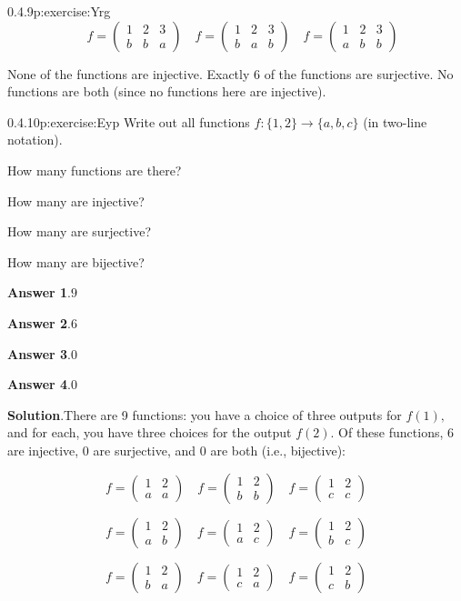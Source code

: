 \documentclass[twoside,11pt,]{book}
\newcommand{\blocktitlefont}{\relax}
\numberwithin{equation}{chapter}
\newcommand{\twoline}[2]{\begin{pmatrix}#1 \\ #2 \end{pmatrix}}
\newcommand{\amp}{&}
\begin{document}
\begin{divisionsolution}{0.4.9}{}{p:exercise:Yrg}
%
\begin{equation*}
\quad f = \begin{pmatrix} 1 \amp 2 \amp 3 \\ b \amp b \amp a \end{pmatrix} \quad f = \begin{pmatrix} 1 \amp 2 \amp 3 \\ b \amp a\amp b \end{pmatrix} \quad f = \begin{pmatrix} 1 \amp 2 \amp 3 \\ a \amp b \amp b \end{pmatrix}
\end{equation*}
%
\par
None of the functions are injective. Exactly 6 of the functions are surjective. No functions are both (since no functions here are injective).%
\end{divisionsolution}%
\begin{divisionsolution}{0.4.10}{}{p:exercise:Eyp}%
Write out all functions \(f: \{1,2\} \to \{a,b,c\}\) (in two-line notation).%
\par
How many functions are there?%
\par
How many are injective?%
\par
How many are surjective?%
\par
How many are bijective?%
\par\smallskip%
\noindent\textbf{\blocktitlefont Answer 1}.\quad{}\(9\)%
\par\smallskip%
\noindent\textbf{\blocktitlefont Answer 2}.\quad{}\(6\)%
\par\smallskip%
\noindent\textbf{\blocktitlefont Answer 3}.\quad{}\(0\)%
\par\smallskip%
\noindent\textbf{\blocktitlefont Answer 4}.\quad{}\(0\)%
\par\smallskip%
\noindent\textbf{\blocktitlefont Solution}.\quad{}There are 9 functions: you have a choice of three outputs for \(f(1)\text{,}\) and for each, you have three choices for the output \(f(2)\text{.}\) Of these functions, 6 are injective, 0 are surjective, and 0 are both (i.e., bijective):%
\par
%
\begin{equation*}
f = \twoline{1 \amp 2}{a\amp a} \quad f = \twoline{1 \amp 2}{b \amp b} \quad f = \twoline{1 \amp 2}{c \amp c}
\end{equation*}
%
\par
%
\begin{equation*}
f = \twoline{1 \amp 2}{a\amp b} \quad f = \twoline{1 \amp 2}{a \amp c} \quad f = \twoline{1 \amp 2}{b \amp c}
\end{equation*}
%
\par
%
\begin{equation*}
f = \twoline{1 \amp 2}{b \amp a} \quad f = \twoline{1 \amp 2}{c \amp a} \quad f = \twoline{1 \amp 2}{c \amp b}
\end{equation*}
%
\end{divisionsolution}%
\end{document}
